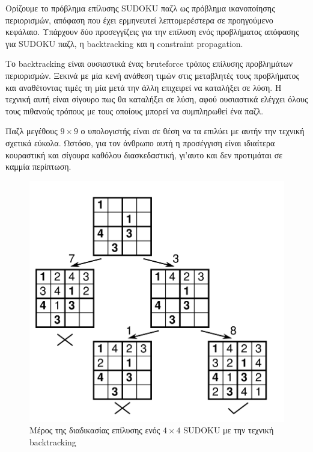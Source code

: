 \documentclass[12pt]{book}
\theoremstyle{definition}
\begin{document}
Ορίζουμε το πρόβλημα επίλυσης SUDOKU παζλ ως πρόβλημα ικανοποίησης περιορισμών, απόφαση που έχει ερμηνευτεί λεπτομερέστερα σε προηγούμενο κεφάλαιο. Υπάρχουν δύο προσεγγίζεις για την επίλυση ενός προβλήματος απόφασης για SUDOKU παζλ, η backtracking και η constraint propagation. \par

Το backtracking είναι ουσιαστικά ένας bruteforce τρόπος επίλυσης προβλημάτων περιορισμών. Ξεκινά με μία κενή ανάθεση τιμών στις μεταβλητές τους προβλήματος και αναθέτοντας τιμές τη μία μετά την άλλη επιχειρεί να καταλήξει σε λύση. Η τεχνική αυτή είναι σίγουρο πως θα καταλήξει σε λύση, αφού ουσιαστικά ελέγχει όλους τους πιθανούς τρόπους με τους οποίους μπορεί να συμπληρωθεί ένα παζλ. \par

Παζλ μεγέθους \(9 \times 9\) ο υπολογιστής είναι σε θέση να τα επιλύει με αυτήν την τεχνική σχετικά εύκολα. Ωστόσο, για τον άνθρωπο αυτή η προσέγγιση είναι ιδιαίτερα κουραστική και σίγουρα καθόλου διασκεδαστική, γι'αυτο και δεν προτιμάται σε καμμία περίπτωση. \par

\begin{figure}[h]
	\centering
	\includegraphics[scale=0.45]{Figures/backtracking.png}
	\caption{Μέρος της διαδικασίας επίλυσης ενός \(4 \times 4\) SUDOKU με την τεχνική backtracking}
\end{figure}
\end{document}
